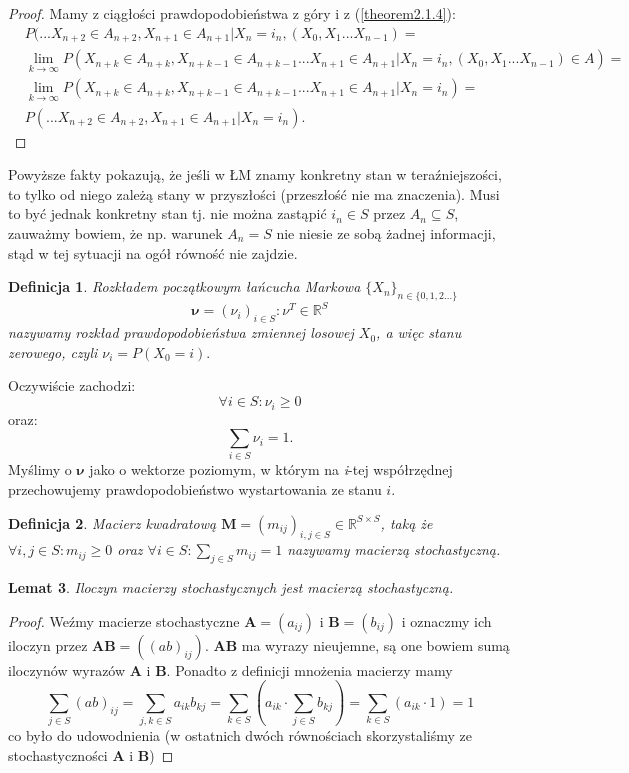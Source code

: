 \documentclass[a4paper]{article}
\theoremstyle{defn}
\newtheorem{defn}{Definicja}[subsection]
\theoremstyle{theorem}
\theoremstyle{lemma}
\newtheorem{lemma}[defn]{Lemat}
\theoremstyle{cor}
\theoremstyle{fact}
\begin{document}
\begin{proof}
Mamy z ciągłości prawdopodobieństwa z góry i z (\ref{theorem2.1.4}):
\begin{align*}
&P(...X_{n+2} \in A_{n+2}, X_{n+1} \in A_{n+1}|X_n = i_n, (X_{0}, X_{1} ... X_{n-1}) =\\ &\lim_{k \to \infty} P(X_{n+k} \in A_{n+k}, X_{n+k-1} \in A_{n+k-1}...X_{n+1} \in A_{n+1}|X_n = i_n, (X_{0}, X_{1} ... X_{n-1}) \in A) = \\
&\lim_{k \to \infty} P(X_{n+k} \in A_{n+k}, X_{n+k-1} \in A_{n+k-1}...X_{n+1} \in A_{n+1}|X_n = i_n) = \\
&P(...X_{n+2} \in A_{n+2}, X_{n+1} \in A_{n+1}|X_n = i_n).
\end{align*}
\end{proof}
Powyższe fakty pokazują, że jeśli w ŁM znamy konkretny stan w teraźniejszości, to tylko od niego zależą stany w przyszłości (przeszłość nie ma znaczenia). Musi to być jednak konkretny stan tj. nie można zastąpić $i_n \in S$ przez $A_n \subseteq S$, zauważmy bowiem, że np. warunek $A_n = S$ nie niesie ze sobą żadnej informacji, stąd w tej sytuacji na ogół równość nie zajdzie.
\begin{defn}\label{defn2.1.6}
\textit{Rozkładem początkowym}  łańcucha Markowa $\{X_n\}_{n \in \{0,1,2...\}}$
$$\boldsymbol{\nu} = (\nu_i)_{i \in S}: \nu^T \in \mathbb{R}^S$$
nazywamy rozkład prawdopodobieństwa zmiennej losowej $X_0$, a więc stanu zerowego, czyli $\nu_i = P(X_0 = i).$
\end{defn}
 Oczywiście zachodzi:
 $$\forall i \in S: \nu_i \geq 0$$
 oraz:
 $$\sum\limits_{i \in S}\nu_i = 1.$$
 Myślimy o $\boldsymbol{\nu}$ jako o wektorze poziomym, w którym na \textit{i}-tej współrzędnej przechowujemy prawdopodobieństwo wystartowania ze stanu $i$.
\begin{defn}\label{2.1.7}
Macierz kwadratową $\boldsymbol{M} = (m_{ij})_{i,j \in S} \in \mathbb{R}^{S \times S}$, taką że $\forall i, j \in S: m_{ij} \geq 0$ oraz $\forall i \in S: \sum\limits_{j \in S} m_{ij} = 1$ nazywamy \textit{macierzą stochastyczną}.
\end{defn}
\begin{lemma}\label{lemma2.1.8}
Iloczyn macierzy stochastycznych jest macierzą stochastyczną.
\end{lemma}
\begin{proof}
Weźmy macierze stochastyczne $\boldsymbol{A}=(a_{ij})$ i $\boldsymbol{B}=(b_{ij})$ i oznaczmy ich iloczyn przez $\boldsymbol{AB} = ((ab)_{ij})$. $\boldsymbol{AB}$ ma wyrazy nieujemne, są one bowiem sumą iloczynów wyrazów $\boldsymbol{A}$ i $\boldsymbol{B}$. Ponadto z definicji mnożenia macierzy mamy $$\sum\limits_{j \in S} (ab)_{ij} = \sum\limits_{j, k \in S} a_{ik}b_{kj} = \sum\limits_{k \in S} (a_{ik} \cdot \sum\limits_{j \in S} b_{kj}) =  \sum\limits_{k \in S} (a_{ik} \cdot 1) = 1$$ co było do udowodnienia (w ostatnich dwóch równościach skorzystaliśmy ze stochastyczności $\boldsymbol{A}$ i $\boldsymbol{B}$) \end{proof}
\end{document}
